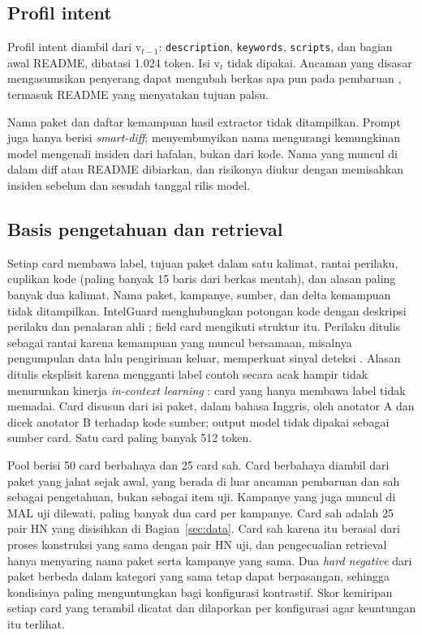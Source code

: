 \documentclass[a4paper,fleqn]{cas-dc}
\begin{document}
\subsection{Profil intent}

Profil intent diambil dari $\mathrm{v}_{t-1}$: \texttt{description},
\texttt{keywords}, \texttt{scripts}, dan bagian awal README, dibatasi 1.024
token. Isi $\mathrm{v}_t$ tidak dipakai. Ancaman yang disasar mengasumsikan
penyerang dapat mengubah berkas apa pun pada pembaruan
\citep{wyss2025evaluating}, termasuk README yang menyatakan tujuan palsu.

Nama paket dan daftar kemampuan hasil extractor tidak ditampilkan. Prompt
\citet{wyss2025evaluating} juga hanya berisi \emph{smart-diff}; menyembunyikan
nama mengurangi kemungkinan model mengenali insiden dari hafalan, bukan dari
kode. Nama yang muncul di dalam diff atau README dibiarkan, dan risikonya
diukur dengan memisahkan insiden sebelum dan sesudah tanggal rilis model.

\subsection{Basis pengetahuan dan retrieval}

Setiap card membawa label, tujuan paket dalam satu kalimat, rantai perilaku,
cuplikan kode (paling banyak 15 baris dari berkas mentah), dan alasan paling
banyak dua kalimat. Nama paket, kampanye, sumber, dan delta kemampuan tidak
ditampilkan. IntelGuard menghubungkan potongan kode dengan deskripsi perilaku
dan penalaran ahli \citep{guo2026bridging}; field card mengikuti struktur itu.
Perilaku ditulis sebagai rantai karena kemampuan yang muncul bersamaan,
misalnya pengumpulan data lalu pengiriman keluar, memperkuat sinyal deteksi
\citep{guo2026effective}. Alasan ditulis eksplisit karena mengganti label
contoh secara acak hampir tidak menurunkan kinerja \emph{in-context learning}
\citep{min2022rethinking}: card yang hanya membawa label tidak memadai.
Card disusun dari isi paket, dalam bahasa Inggris, oleh anotator A dan dicek
anotator B terhadap kode sumber; output model tidak dipakai sebagai sumber
card. Satu card paling banyak 512 token.

Pool berisi 50 card berbahaya dan 25 card sah. Card berbahaya diambil dari
paket yang jahat sejak awal, yang berada di luar ancaman pembaruan
\citep{sofaer2024rogueone} dan sah sebagai pengetahuan, bukan sebagai item uji.
Kampanye yang juga muncul di MAL uji dilewati, paling banyak dua card per
kampanye. Card sah adalah 25 pair HN yang disisihkan di Bagian~\ref{sec:data}.
Card sah karena itu berasal dari proses konstruksi yang sama dengan pair HN uji,
dan pengecualian retrieval hanya menyaring nama paket serta kampanye yang sama.
Dua \emph{hard negative} dari paket berbeda dalam kategori yang sama tetap dapat
berpasangan, sehingga kondisinya paling menguntungkan bagi konfigurasi
kontrastif. Skor kemiripan setiap card yang terambil dicatat dan dilaporkan per
konfigurasi agar keuntungan itu terlihat.
\end{document}
